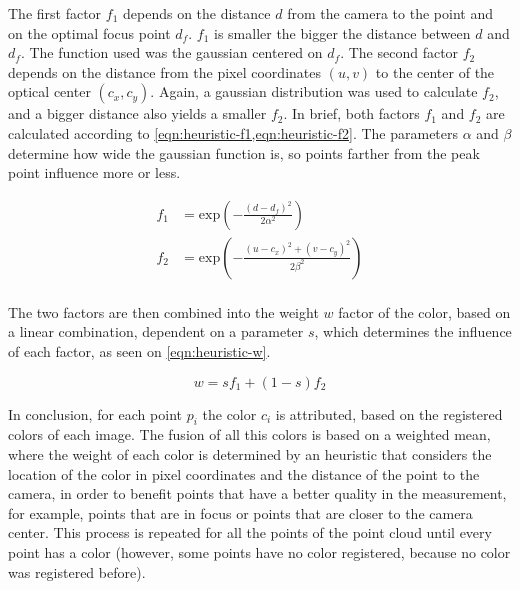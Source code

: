 The first factor $f_1$ depends on the distance $d$ from the camera to the point and on the optimal focus point $d_f$. $f_1$ is smaller the bigger the distance between $d$ and $d_f$. The function used was the gaussian centered on $d_f$. The second factor $f_2$ depends on the distance from the pixel coordinates $(u,v)$ to the center of the optical center $(c_x, c_y)$. Again, a gaussian distribution was used to calculate $f_2$, and a bigger distance also yields a smaller $f_2$. In brief, both factors $f_1$ and $f_2$ are calculated according to \cref{eqn:heuristic-f1,eqn:heuristic-f2}. The parameters $\alpha$ and $\beta$ determine how wide the gaussian function is, so points farther from the peak point influence more or less. 

\begin{align}
    \label{eqn:heuristic-f1}
    f_1 & = \mathrm{exp}\left(-\frac{(d-d_f)^2}{2\alpha^2}\right) \\
    \label{eqn:heuristic-f2}
    f_2 & = \mathrm{exp}\left(-\frac{(u-c_x)^2 + (v-c_y)^2}{2\beta^2}\right) \\
\end{align}

The two factors are then combined into the weight $w$ factor of the color, based on a linear combination, dependent on a parameter $s$, which determines the influence of each factor, as seen on \cref{eqn:heuristic-w}. 

\begin{equation}
    \label{eqn:heuristic-w}
    w = s f_1 + (1-s) f_2
\end{equation}

In conclusion, for each point $p_i$ the color $c_i$ is attributed, based on the registered colors of each image. The fusion of all this colors is based on a weighted mean, where the weight of each color is determined by an heuristic that considers the location of the color in pixel coordinates and the distance of the point to the camera, in order to benefit points that have a better quality in the measurement, for example, points that are in focus or points that are closer to the camera center. This process is repeated for all the points of the point cloud until every point has a color (however, some points have no color registered, because no color was registered before).